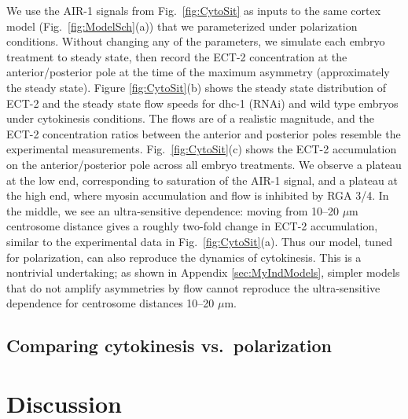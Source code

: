 \documentclass[11pt]{article}
\begin{document}
We use the AIR-1 signals from Fig.\ \ref{fig:CytoSit} as inputs to the same cortex model (Fig.\ \ref{fig:ModelSch}(a)) that we parameterized under polarization conditions. Without changing any of the parameters, we simulate each embryo treatment to steady state, then record the ECT-2 concentration at the anterior/posterior pole at the time of the maximum asymmetry (approximately the steady state). Figure \ref{fig:CytoSit}(b) shows the steady state distribution of ECT-2 and the steady state flow speeds for dhc-1 (RNAi) and wild type embryos under cytokinesis conditions. The flows are of a realistic magnitude, and the ECT-2 concentration ratios between the anterior and posterior poles resemble the experimental measurements. Fig.\ \ref{fig:CytoSit}(c) shows the ECT-2 accumulation on the anterior/posterior pole across all embryo treatments. We observe a plateau at the low end, corresponding to saturation of the AIR-1 signal, and a plateau at the high end, where myosin accumulation and flow is inhibited by RGA 3/4. In the middle, we see an ultra-sensitive dependence: moving from 10--20 $\mu$m centrosome distance gives a roughly two-fold change in ECT-2 accumulation, similar to the experimental data in Fig.\ \ref{fig:CytoSit}(a). Thus our model, tuned for polarization, can also reproduce the dynamics of cytokinesis. This is a nontrivial undertaking; as shown in Appendix \ref{sec:MyIndModels}, simpler models that do not amplify asymmetries by flow cannot reproduce the ultra-sensitive dependence for centrosome distances 10--20 $\mu$m.

\subsection{Comparing cytokinesis vs.\ polarization}

\section{Discussion}
\end{document}
